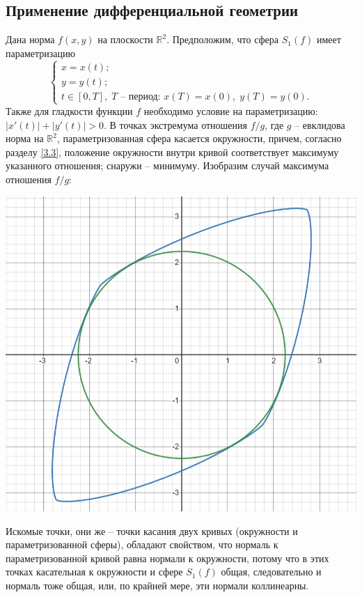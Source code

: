 \documentclass{article}
\begin{document}
\subsection{Применение дифференциальной геометрии} \label{3.4}
Дана норма $f(x,y)$ на плоскости $\mathbb{R}^2$. Предположим, что сфера $S_1(f)$ имеет параметризацию
\begin{equation*}
	\begin{cases}
		x = x(t); \\
		y = y(t); \\
		t \in [0, T], \; T \text{ -- период: } x(T) = x(0), \; y(T) = y(0).
	\end{cases}
\end{equation*}
Также для гладкости функции $f$ необходимо условие на параметризацию: $|x'(t)| + |y'(t)| > 0$. В точках экстремума отношения $f/g$, где $g$ -- евклидова норма на $\mathbb{R}^2$, параметризованная сфера касается окружности, причем, согласно разделу \ref{3.3}, положение окружности внутри кривой соответствует максимуму указанного отношения; снаружи -- минимуму. Изобразим случай максимума отношения $f/g$: 
\begin{center}
\includegraphics[scale=0.55]{pictures/s1f_circle.png}
\end{center}
Искомые точки, они же -- точки касания двух кривых (окружности и параметризованной сферы), обладают свойством, что нормаль к параметризованной кривой равна нормали к окружности, потому что в этих точках касательная к окружности и сфере $S_1(f)$ общая, следовательно и нормаль тоже общая, или, по крайней мере, эти нормали коллинеарны.
\end{document}
